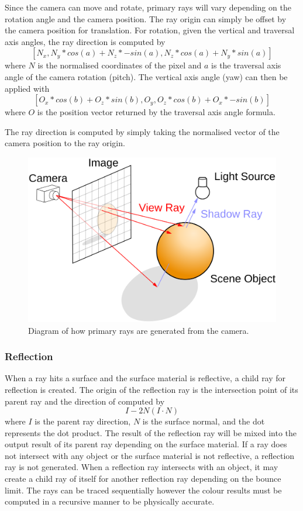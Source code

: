 \documentclass[final]{cmpreport}
\begin{document}
Since the camera can move and rotate, primary rays will vary depending on the rotation angle and the camera position. The ray origin can simply be offset by the camera position for translation. For rotation, given the vertical and traversal axis angles, the ray direction is computed by 
$$[ N_x, N_y * cos(a) + N_z * -sin(a), N_z * cos(a) + N_y * sin(a) ]$$ where $N$ is the normalised coordinates of the pixel and $a$ is the traversal axis angle of the camera rotation (pitch). The vertical axis angle (yaw) can then be applied with $$[ O_x * cos(b) + O_z * sin(b), O_y, O_z * cos(b) + O_x * -sin(b) ]$$ where $O$ is the position vector returned by the traversal axis angle formula.

The ray direction is computed by simply taking the normalised vector of the camera position to the ray origin.

\begin{figure}
    \centering
    \includegraphics[width=\textwidth]{img/backward_ray_tracing.png}
    \caption{Diagram of how primary rays are generated from the camera. \citep{henrikdia}}
\end{figure}

\subsubsection{Reflection}

When a ray hits a surface and the surface material is reflective, a child ray for reflection is created. The origin of the reflection ray is the intersection point of its parent ray and the direction of computed by $$I - 2N(I \cdot N)$$ where $I$ is the parent ray direction, $N$ is the surface normal, and the dot represents the dot product. The result of the reflection ray will be mixed into the output result of its parent ray depending on the surface material. If a ray does not intersect with any object or the surface material is not reflective, a reflection ray is not generated. When a reflection ray intersects with an object, it may create a child ray of itself for another reflection ray depending on the bounce limit. The rays can be traced sequentially however the colour results must be computed in a recursive manner to be physically accurate.
\end{document}
